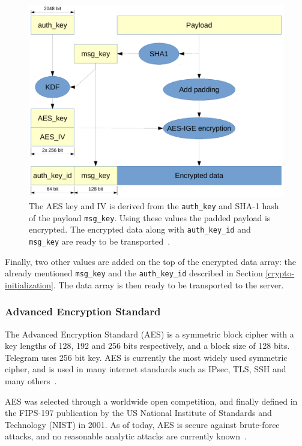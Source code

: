 \documentclass[thesis=M,english]{FITthesis}[2012/10/20]
\begin{document}
\begin{figure}[htb]
	\centering
	\includegraphics[width=1\textwidth]{mtproto-encflow.pdf}
	\caption[MTProto encryption flow]{The AES key and IV is derived from the \texttt{auth\_key} and SHA-1 hash of the payload \texttt{msg\_key}. Using these values the padded payload is encrypted. The encrypted data along with \texttt{auth\_key\_id} and \texttt{msg\_key} are ready to be transported~\cite{telegram-aarhus}.}
	\label{img:crypto-regular-enc}
\end{figure}

Finally, two other values are added on the top of the encrypted data array: the already mentioned \texttt{msg\_key} and the \texttt{auth\_key\_id} described in Section \ref{crypto-initialization}. The data array is then ready to be transported to the server.

\subsubsection{Advanced Encryption Standard}

The Advanced Encryption Standard (AES) is a symmetric block cipher with a key lengths of 128, 192 and 256 bits respectively, and a block size of 128 bits. Telegram uses 256 bit key. AES is currently the most widely used symmetric cipher, and is used in many internet standards such as IPsec, TLS, SSH and many others~\cite{understanding-crypto}.

AES was selected through a worldwide open competition, and finally defined in the FIPS-197 publication by the US National Institute of Standards and Technology (NIST) in 2001. As of today, AES is secure against brute-force attacks, and no reasonable analytic attacks are currently known~\cite{understanding-crypto}.
\end{document}

